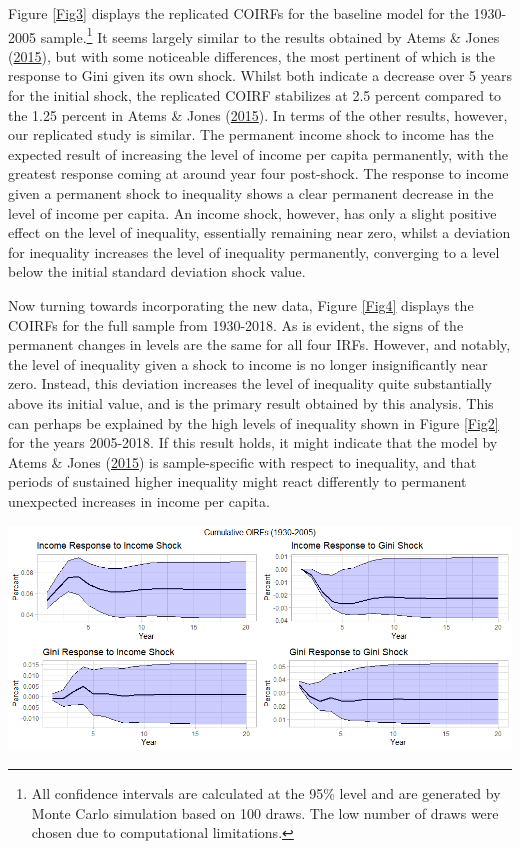 \documentclass[11pt,preprint, authoryear]{elsarticle}
\let\origfigure\figure
\let\endorigfigure\endfigure
\renewenvironment{figure}[1][2] {
    \expandafter\origfigure\expandafter[H]
} {
    \endorigfigure
}
\numberwithin{equation}{section}
\numberwithin{figure}{section}
\numberwithin{table}{section}
\let\rmarkdownfootnote\footnote%
\def\footnote{\protect\rmarkdownfootnote}
\begin{document}
Figure \ref{Fig3} displays the replicated COIRFs for the baseline model
for the 1930-2005 sample.\footnote{All confidence intervals are
  calculated at the 95\% level and are generated by Monte Carlo
  simulation based on 100 draws. The low number of draws were chosen due
  to computational limitations.} It seems largely similar to the results
obtained by Atems \& Jones (\protect\hyperlink{ref-atems}{2015}), but
with some noticeable differences, the most pertinent of which is the
response to Gini given its own shock. Whilst both indicate a decrease
over 5 years for the initial shock, the replicated COIRF stabilizes at
2.5 percent compared to the 1.25 percent in Atems \& Jones
(\protect\hyperlink{ref-atems}{2015}). In terms of the other results,
however, our replicated study is similar. The permanent income shock to
income has the expected result of increasing the level of income per
capita permanently, with the greatest response coming at around year
four post-shock. The response to income given a permanent shock to
inequality shows a clear permanent decrease in the level of income per
capita. An income shock, however, has only a slight positive effect on
the level of inequality, essentially remaining near zero, whilst a
deviation for inequality increases the level of inequality permanently,
converging to a level below the initial standard deviation shock value.

Now turning towards incorporating the new data, Figure \ref{Fig4}
displays the COIRFs for the full sample from 1930-2018. As is evident,
the signs of the permanent changes in levels are the same for all four
IRFs. However, and notably, the level of inequality given a shock to
income is no longer insignificantly near zero. Instead, this deviation
increases the level of inequality quite substantially above its initial
value, and is the primary result obtained by this analysis. This can
perhaps be explained by the high levels of inequality shown in Figure
\ref{Fig2} for the years 2005-2018. If this result holds, it might
indicate that the model by Atems \& Jones
(\protect\hyperlink{ref-atems}{2015}) is sample-specific with respect to
inequality, and that periods of sustained higher inequality might react
differently to permanent unexpected increases in income per capita.

\newpage

\begin{figure}[H]

{\centering \includegraphics[width=1\linewidth]{images/Fig3_rep_COIRFs} 

}

\caption{\label{Fig3}}\label{fig:Fig3}
\end{figure}
\end{document}
